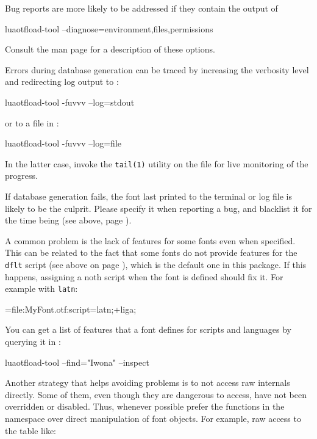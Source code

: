 Bug reports are more likely to be addressed if they contain the output
of

\beginlisting
    luaotfload-tool --diagnose=environment,files,permissions
\endlisting

\noindent Consult the man page for a description of these options.

Errors during database generation can be traced by increasing the
verbosity level and redirecting log output to :

\beginlisting
    luaotfload-tool -fuvvv --log=stdout
\endlisting

\noindent or to a file in :

\beginlisting
    luaotfload-tool -fuvvv --log=file
\endlisting

\noindent In the latter case, invoke the \verb|tail(1)| utility on the
file for live monitoring of the progress.

If database generation fails, the font last printed to the terminal or
log file is likely to be the culprit.
%
Please specify it when reporting a bug, and blacklist it for the time
being (see above, page \pageref{font-blacklist}).

\endsubsection


A common problem is the lack of features for some
\OpenType fonts even when specified.
%
This can be related to the fact that some fonts do not provide features
for the \verb|dflt| script (see above on page \pageref{script-tag}),
which is the default one in this package.
%
If this happens, assigning a noth script when the font is defined should
fix it.
%
For example with \verb|latn|:

\beginlisting
    \font\test=file:MyFont.otf:script=latn;+liga;
\endlisting

You can get a list of features that a font defines for scripts and
languages by querying it in :

\beginlisting
    luaotfload-tool --find="Iwona" --inspect
\endlisting

\endsubsection


Another strategy that helps avoiding problems is to not access raw
\LUATEX internals directly.
%
Some of them, even though they are dangerous to access, have not been
overridden or disabled.
%
Thus, whenever possible prefer the functions in the 
namespace over direct manipulation of font objects. For example, raw
access to the  table like:


